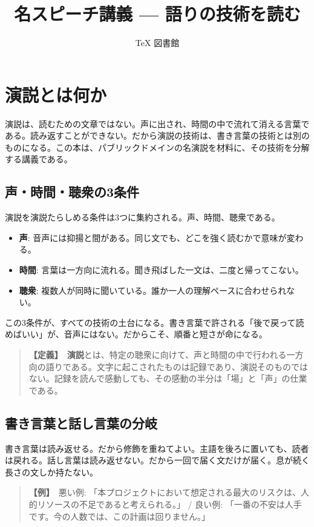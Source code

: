 \documentclass{article}
\title{名スピーチ講義 — 語りの技術を読む}
\author{TeX 図書館}
\begin{document}
\section{演説とは何か}

演説は、読むための文章ではない。声に出され、時間の中で流れて消える言葉である。読み返すことができない。だから演説の技術は、書き言葉の技術とは別のものになる。この本は、パブリックドメインの名演説を材料に、その技術を分解する講義である。

\subsection{声・時間・聴衆の3条件}

演説を演説たらしめる条件は3つに集約される。声、時間、聴衆である。

\begin{itemize}
\item \textbf{声}: 音声には抑揚と間がある。同じ文でも、どこを強く読むかで意味が変わる。
\item \textbf{時間}: 言葉は一方向に流れる。聞き飛ばした一文は、二度と帰ってこない。
\item \textbf{聴衆}: 複数人が同時に聞いている。誰か一人の理解ペースに合わせられない。
\end{itemize}

この3条件が、すべての技術の土台になる。書き言葉で許される「後で戻って読めばいい」が、音声にはない。だからこそ、順番と短さが命になる。

\begin{quote}
\textbf{【定義】}\ \textbf{演説}とは、特定の聴衆に向けて、声と時間の中で行われる一方向の語りである。文字に起こされたものは記録であり、演説そのものではない。記録を読んで感動しても、その感動の半分は「場」と「声」の仕業である。
\end{quote}

\subsection{書き言葉と話し言葉の分岐}

書き言葉は読み返せる。だから修飾を重ねてよい。主語を後ろに置いても、読者は戻れる。話し言葉は読み返せない。だから一回で届く文だけが届く。息が続く長さの文しか持たない。

\begin{quote}
\textbf{【例】}\ 悪い例: 「本プロジェクトにおいて想定される最大のリスクは、人的リソースの不足であると考えられる。」 / 良い例: 「一番の不安は人手です。今の人数では、この計画は回りません。」
\end{quote}
\end{document}

